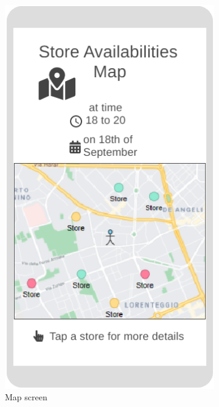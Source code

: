 \begin{figure}[h!]
	\centering
	\begin{subfigure}[b]{0.3\textwidth}
		\includegraphics[width=\linewidth]{../Diagrams/WireframesCLup/StoreMap.png}
		\caption{Map screen}
		\label{fig:WfStoreMap}
	\end{subfigure}
	\hfill
	\begin{subfigure}[b]{0.3\textwidth}

\end{subfigure}
\end{figure}
